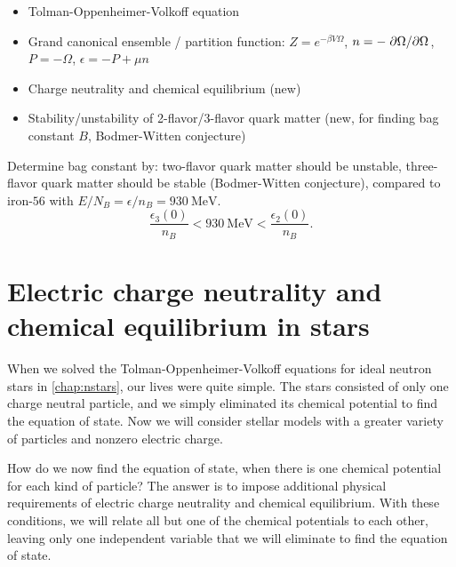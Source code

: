\begin{itemize}
\item Tolman-Oppenheimer-Volkoff equation
\item Grand canonical ensemble / partition function: $Z = e^{-\beta V \Omega}$, $n = -\pdv{\Omega}/{\Omega}$, $P = -\Omega$, $\epsilon = -P + \mu n$
\item Charge neutrality and chemical equilibrium (new)
\item Stability/unstability of 2-flavor/3-flavor quark matter (new, for finding bag constant $B$, Bodmer-Witten conjecture)
\end{itemize}


Determine bag constant by:
two-flavor quark matter should be unstable,
three-flavor quark matter should be stable (Bodmer-Witten conjecture),
compared to iron-$56$ with $E/N_B = \epsilon/n_B = \SI{930}{\mega\electronvolt}$.
\begin{equation}
	\frac{\epsilon_3(0)}{n_B} < \SI{930}{\mega\electronvolt} < \frac{\epsilon_2(0)}{n_B} .
\label{eq:lsm:bag_stability}
\end{equation}




\section{Electric charge neutrality and chemical equilibrium in stars}


When we solved the Tolman-Oppenheimer-Volkoff equations for ideal neutron stars in \cref{chap:nstars}, our lives were quite simple.
The stars consisted of only one charge neutral particle, and we simply eliminated its chemical potential to find the equation of state.
Now we will consider stellar models with a greater variety of particles and nonzero electric charge.

How do we now find the equation of state, when there is one chemical potential for each kind of particle?
The answer is to impose additional physical requirements of electric charge neutrality and chemical equilibrium.
With these conditions, we will relate all but one of the chemical potentials to each other, leaving only one independent variable that we will eliminate to find the equation of state.

